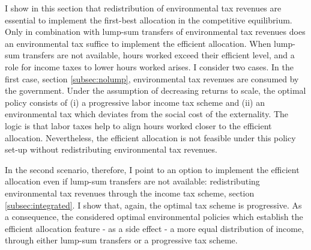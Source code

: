 I show in this section that redistribution of environmental tax revenues are essential to implement the first-best allocation in the competitive equilibrium. Only in combination with lump-sum transfers of  environmental tax revenues does an environmental tax suffice to implement the efficient allocation. %
When lump-sum transfers are not available, hours worked exceed their efficient level, and a role for income taxes to lower hours worked arises. I consider two cases.
In the first case, section \ref{subsec:nolump}, environmental tax revenues are consumed by the government. Under the assumption of decreasing returns to scale, the optimal policy consists of (i) a progressive labor income tax scheme and (ii) an environmental tax which deviates from the social cost of the externality. The logic is that labor taxes help to align hours worked closer to the efficient allocation. 
Nevertheless, the efficient allocation is not feasible under this policy set-up without redistributing environmental tax revenues.

In the second scenario, therefore, I point to an option to implement the efficient allocation even if lump-sum transfers are not available: redistributing environmental tax revenues through the income tax scheme, section \ref{subsec:integrated}.
 I show that, again, the optimal tax scheme is progressive. 
As a consequence, the considered optimal environmental policies which establish the efficient allocation feature - as a side effect - a more equal distribution of income, through either lump-sum transfers or a progressive tax scheme.%


